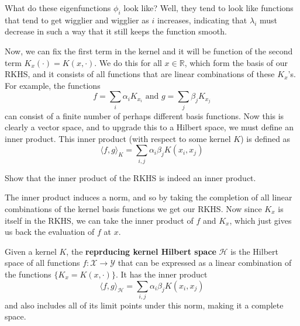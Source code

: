 \documentclass{article}
\begin{document}
    What do these eigenfunctions $\phi_i$ look like? Well, they tend to look like functions that tend to get wigglier and wigglier as $i$ increases, indicating that $\lambda_i$ must decrease in such a way that it still keeps the function smooth. 

    Now, we can fix the first term in the kernel and it will be function of the second term $K_x (\cdot) = K(x, \cdot)$. We do this for all $x \in \mathbb{R}$, which form the basis of our RKHS, and it consists of all functions that are linear combinations of these $K_x$'s. For example, the functions 
    \begin{equation}
      f = \sum_i \alpha_i K_{x_i} \text{ and } g = \sum_j \beta_j K_{x_j} 
    \end{equation}
    can consist of a finite number of perhaps different basis functions. Now this is clearly a vector space, and to upgrade this to a Hilbert space, we must define an inner product. This inner product (with respect to some kernel $K$) is defined as 
    \begin{equation}
      \langle f, g \rangle_K = \sum_{i, j} \alpha_i \beta_j K(x_i, x_j)
    \end{equation}

    \begin{exercise}
      Show that the inner product of the RKHS is indeed an inner product.
    \end{exercise}

    The inner product induces a norm, and so by taking the completion of all linear combinations of the kernel basis functions we get our RKHS. Now since $K_x$ is itself in the RKHS, we can take the inner product of $f$ and $K_x$, which just gives us back the evaluation of $f$ at $x$. 

    \begin{definition}
      Given a kernel $K$, the \textbf{reprducing kernel Hilbert space} $\mathcal{H}$ is the Hilbert space of all functions $f: \mathcal{X} \rightarrow \mathcal{Y}$ that can be expressed as a linear combination of the functions $\{K_x = K(x, \cdot)\}$. It has the inner product 
      \begin{equation}
        \langle f, g \rangle_{\mathcal{H}} = \sum_{i, j} \alpha_i \beta_j K(x_i, x_j)
      \end{equation}
      and also includes all of its limit points under this norm, making it a complete space. 
    \end{definition}
\end{document}
